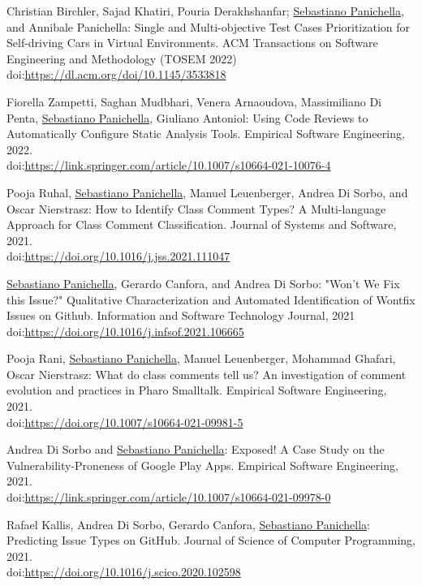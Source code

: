 \documentclass[10pt]{article}
\newcommand\doilink[1]{\href{http://dx.doi.org/#1}{#1}}
\newcommand\doi[1]{doi:\doilink{#1}}
\begin{document}
\begin{bibenum}
\item \label{J17} Christian Birchler, Sajad Khatiri, Pouria Derakhshanfar; \underline{Sebastiano Panichella}, and Annibale Panichella: Single and Multi-objective Test Cases Prioritization for Self-driving Cars in Virtual Environments.    ACM Transactions on Software Engineering and Methodology (TOSEM 2022) \doi{https://dl.acm.org/doi/10.1145/3533818} 
\item \label{J16} Fiorella Zampetti, Saghan Mudbhari, Venera Arnaoudova, Massimiliano Di Penta, \underline{Sebastiano Panichella}, Giuliano Antoniol: Using Code Reviews to Automatically Configure Static Analysis Tools.    Empirical Software Engineering, 2022.  \\ \doi{https://link.springer.com/article/10.1007/s10664-021-10076-4} 
\item \label{J15} Pooja Ruhal, \underline{Sebastiano Panichella}, Manuel Leuenberger, Andrea Di Sorbo, and Oscar Nierstrasz: How to Identify Class Comment Types? A Multi-language Approach for Class Comment Classification. Journal of Systems and Software, 2021.  \\\doi{https://doi.org/10.1016/j.jss.2021.111047}
\item \label{J14} \underline{Sebastiano Panichella}, Gerardo Canfora, and Andrea Di Sorbo: "Won't We Fix this Issue?" Qualitative Characterization and Automated Identification of Wontfix Issues on Github. Information and Software Technology Journal, 2021 \\ \doi{https://doi.org/10.1016/j.infsof.2021.106665} 
\item \label{J13}  Pooja Rani, \underline{Sebastiano Panichella}, Manuel Leuenberger, Mohammad Ghafari, Oscar Nierstrasz: What do class comments tell us? An investigation of comment evolution and practices in Pharo Smalltalk. Empirical Software Engineering, 2021. \\ \doi{https://doi.org/10.1007/s10664-021-09981-5} 
\item \label{J12}  Andrea Di Sorbo and \underline{Sebastiano Panichella}: Exposed! A Case Study on the Vulnerability-Proneness of Google Play Apps.    Empirical Software Engineering, 2021. \\ \doi{https://link.springer.com/article/10.1007/s10664-021-09978-0} 
\item \label{J11}  Rafael Kallis, Andrea Di Sorbo, Gerardo Canfora, \underline{Sebastiano Panichella}: Predicting Issue Types on GitHub.  Journal of Science of Computer Programming, 2021.   \\ \doi{https://doi.org/10.1016/j.scico.2020.102598} 

\end{bibenum}
\end{document}
